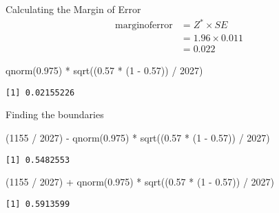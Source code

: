 \documentclass[
  ignorenonframetext,
]{beamer}
\newenvironment{Shaded}{\begin{snugshade}}{\end{snugshade}}
\newcommand{\DecValTok}[1]{\textcolor[rgb]{0.68,0.00,0.00}{#1}}
\newcommand{\FloatTok}[1]{\textcolor[rgb]{0.68,0.00,0.00}{#1}}
\newcommand{\FunctionTok}[1]{\textcolor[rgb]{0.28,0.35,0.67}{#1}}
\newcommand{\NormalTok}[1]{\textcolor[rgb]{0.00,0.23,0.31}{#1}}
\newcommand{\SpecialCharTok}[1]{\textcolor[rgb]{0.37,0.37,0.37}{#1}}
\begin{document}
\begin{frame}[fragile]{Calculating the Margin of Error}
\label{calculating-the-margin-of-error}
\[
\begin{aligned}
\operatorname{margin of error} &= Z^* \times SE \\
&= 1.96 \times 0.011 \\
&= 0.022
\end{aligned}
\]

\pause

\begin{Shaded}
\begin{Highlighting}[]
\FunctionTok{qnorm}\NormalTok{(}\FloatTok{0.975}\NormalTok{) }\SpecialCharTok{*} \FunctionTok{sqrt}\NormalTok{((}\FloatTok{0.57} \SpecialCharTok{*}\NormalTok{ (}\DecValTok{1} \SpecialCharTok{{-}} \FloatTok{0.57}\NormalTok{)) }\SpecialCharTok{/} \DecValTok{2027}\NormalTok{)}
\end{Highlighting}
\end{Shaded}

\begin{verbatim}
[1] 0.02155226
\end{verbatim}
\end{frame}

\begin{frame}[fragile]{Finding the boundaries}
\label{finding-the-boundaries}
\begin{Shaded}
\begin{Highlighting}[]
\NormalTok{(}\DecValTok{1155} \SpecialCharTok{/} \DecValTok{2027}\NormalTok{) }\SpecialCharTok{{-}} \FunctionTok{qnorm}\NormalTok{(}\FloatTok{0.975}\NormalTok{) }\SpecialCharTok{*} \FunctionTok{sqrt}\NormalTok{((}\FloatTok{0.57} \SpecialCharTok{*}\NormalTok{ (}\DecValTok{1} \SpecialCharTok{{-}} \FloatTok{0.57}\NormalTok{)) }\SpecialCharTok{/} \DecValTok{2027}\NormalTok{)}
\end{Highlighting}
\end{Shaded}

\begin{verbatim}
[1] 0.5482553
\end{verbatim}

\begin{Shaded}
\begin{Highlighting}[]
\NormalTok{(}\DecValTok{1155} \SpecialCharTok{/} \DecValTok{2027}\NormalTok{) }\SpecialCharTok{+} \FunctionTok{qnorm}\NormalTok{(}\FloatTok{0.975}\NormalTok{) }\SpecialCharTok{*} \FunctionTok{sqrt}\NormalTok{((}\FloatTok{0.57} \SpecialCharTok{*}\NormalTok{ (}\DecValTok{1} \SpecialCharTok{{-}} \FloatTok{0.57}\NormalTok{)) }\SpecialCharTok{/} \DecValTok{2027}\NormalTok{)}
\end{Highlighting}
\end{Shaded}

\begin{verbatim}
[1] 0.5913599
\end{verbatim}
\end{frame}
\end{document}
